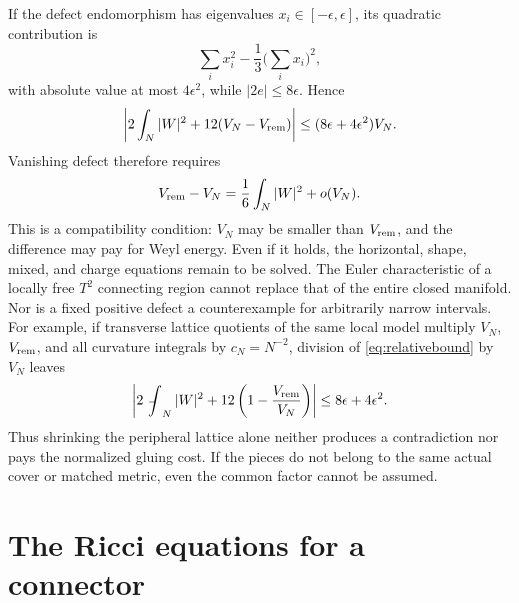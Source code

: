 \documentclass[a4paper,11pt]{article}
\numberwithin{equation}{section}
\theoremstyle{definition}
\newcommand{\fint}{\mathop{\rlap{\,\raisebox{0.1ex}{\tiny$-$}}\int}\nolimits}
\begin{document}
If the defect endomorphism has eigenvalues $x_i\in[-\epsilon,\epsilon]$, its quadratic contribution is
\[
\sum_i x_i^2-\frac13\Big(\sum_i x_i\Big)^2,
\]
with absolute value at most $4\epsilon^2$, while $|2e|\le8\epsilon$. Hence
\begin{equation}\label{eq:relativebound}
\left|2\int_N|W|^2+12(V_N-V_{\rm rem})\right|
\le(8\epsilon+4\epsilon^2)V_N.
\end{equation}
Vanishing defect therefore requires
\[
V_{\rm rem}-V_N=\frac16\int_N|W|^2+o(V_N).
\]
This is a compatibility condition: $V_N$ may be smaller than $V_{\rm rem}$, and the difference may pay for Weyl energy.
Even if it holds, the horizontal, shape, mixed, and charge equations remain to be solved. The Euler characteristic of a locally free $T^2$ connecting region cannot replace that of the entire closed manifold. Nor is a fixed positive defect a counterexample for arbitrarily narrow intervals.
For example, if transverse lattice quotients of the same local model multiply $V_N$, $V_{\rm rem}$, and all curvature integrals by $c_N=N^{-2}$, division of \eqref{eq:relativebound} by $V_N$ leaves
\begin{equation}\label{eq:relative-scale-invariant}
 \left|2\fint_N|W|^2+
 12\left(1-\frac{V_{\rm rem}}{V_N}\right)\right|
 \le8\epsilon+4\epsilon^2.
\end{equation}
Thus shrinking the peripheral lattice alone neither produces a contradiction nor pays the normalized gluing cost.
If the pieces do not belong to the same actual cover or matched metric, even the common factor cannot be assumed.

\section{The Ricci equations for a connector}
\end{document}
